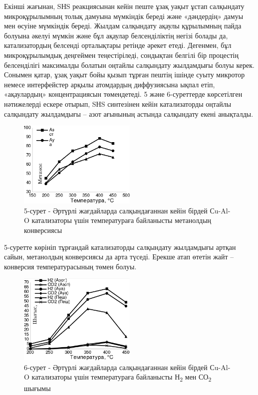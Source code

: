 \begin{multicols}{2}
Екінші жағынан, SНS реакциясынан кейін пеште ұзақ уақыт ұстап салқындату
микроқұрылымның толық дамуына мүмкіндік береді және «дәндердің» дамуы
мен өсуіне мүмкіндік береді. Жылдам салқындату ақаулы құрылымның пайда
болуына әкелуі мүмкін және бұл ақаулар белсенділіктің негізі болады да,
катализатордың белсенді орталықтары ретінде әрекет етеді. Дегенмен, бұл
микроқұрылымдық деңгеймен теңестіріледі, сондықтан белгілі бір процестің
белсенділігі максималды болатын оңтайлы салқындату жылдамдығы болуы
керек. Сонымен қатар, ұзақ уақыт бойы қызып тұрған пештің ішінде суыту
микротор немесе интерфейстер арқылы атомдардың диффузиясына ықпал етіп,
«ақаулардың» концентрациясын төмендетеді. 5 және 6-суреттерде
көрсетілген нәтижелерді ескере отырып, SНS синтезінен кейін
катализаторды оңтайлы салқындату жылдамдығы -- азот ағынының астында
салқындату екені анықталды.
\end{multicols}

\begin{figure}[H]
	\centering
	\includegraphics[width=0.5\textwidth]{assets/74.1}
	\caption*{5-сурет - Әртүрлі жағдайларда салқындағаннан кейін бірдей Сu-Al-O катализаторы үшін температураға байланысты метанолдың конверсиясы}
\end{figure}

5-суретте көрініп тұрғандай катализаторды салқындату жылдамдығы артқан
сайын, метанолдың конверсиясы да арта түседі. Ерекше атап өтетін жайт --
конверсия температурасының төмен болуы.

\begin{figure}[H]
	\centering
	\includegraphics[width=0.5\textwidth]{assets/74.2}
	\caption*{6-сурет - Әртүрлі жағдайларда салқындағаннан кейін бірдей Сu-Al-O катализаторы үшін температураға байланысты Н\textsubscript{2} мен СО\textsubscript{2} шығымы}
\end{figure}

